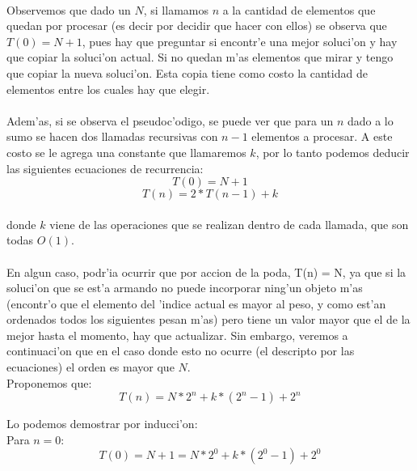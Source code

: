 \paragraph{}
Observemos que dado un $N$, si llamamos $n$ a la cantidad de elementos que quedan por procesar (es decir por 
decidir que hacer con ellos) se observa que $T(0) = N + 1$, pues hay que preguntar si encontr'e una 
mejor soluci'on y hay que copiar la soluci'on actual. Si no quedan m'as elementos que mirar y tengo que copiar 
la nueva soluci'on. Esta copia tiene como costo la cantidad de elementos entre los cuales hay que elegir.
\paragraph{}
Adem'as, si se observa el pseudoc'odigo, se puede ver que para un $n$ dado a lo sumo se hacen dos llamadas 
recursivas con $n - 1$ elementos a procesar. A este costo se le agrega una constante que llamaremos $k$, 
por lo tanto podemos deducir las siguientes ecuaciones de recurrencia:\\

$$T(0) = N + 1$$
$$T(n) = 2*T(n-1) + k$$

\paragraph{}
donde $k$ viene de las operaciones que se realizan dentro de cada llamada, que son todas $O(1)$.
\paragraph{}
En algun caso, podr'ia ocurrir que por accion de la poda, T(n) = N, ya que si la soluci'on que 
se est'a armando no puede incorporar ning'un objeto m'as (encontr'o que el elemento del 'indice actual 
es mayor al peso, y como est'an ordenados todos los siguientes pesan m'as) pero tiene un valor mayor 
que el de la mejor hasta el momento, hay que actualizar. Sin embargo, veremos a continuaci'on que en el 
caso donde esto no ocurre (el descripto por las ecuaciones) el orden es mayor que $N$.\\

Proponemos que: $$T(n) = N*2^n + k*(2^n-1) + 2^n$$

Lo podemos demostrar por inducci'on:\\

Para $n = 0$:\\

$$T(0) = N + 1 =  N*2^0 + k*(2^0-1) + 2^0$$

